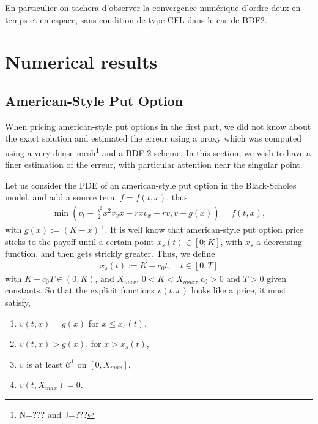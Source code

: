 \documentclass[12pt,a4paper]{article}
\begin{document}
En particulier on tachera d’observer la convergence numérique d’ordre deux en temps et en espace, sans condition de type CFL dans le cas de BDF2.

	\section{Numerical results}

		\subsection{American-Style Put Option}

When pricing american-style put options in the first part, we did not know about the exact solution and estimated the erreur using a proxy which was computed using a very dense mesh\footnote{N=??? and J=???} and a BDF-2 scheme. In this section, we wish to have a finer estimation of the erreur, with particular attention near the singular point.

Let us consider the PDE of an american-style put option in the Black-Scholes model, and add a source term $f = f(t,x)$, thus 
\begin{align}
	\min \left( v_t - \frac{\lambda^2}{2} x^2 v_xx - r x v_x + r v, v - g(x) \right) = f(t,x), \label{eq-PDE_ameroption_source}
\end{align} 
with $g(x) := (K-x)^+$. It is well know that american-style put option price sticks to the payoff until a certain point $x_s(t) \in [0; K]$, with $x_s$ a decreasing function, and then gets strickly greater. Thus, we define
\begin{align*}
	x_s(t) := K - c_0 t,  \quad t \in [0,T]
\end{align*}
with $K-c_0T \in (0, K)$, and $X_{max}$, $0<K<X_{max}$, $c_0>0$ and $T>0$ given constants. So that the explicit functions $v(t,x)$ looks like a price, it must satisfy,
\begin{small}
\begin{enumerate}
	\item $v(t,x) = g(x)$ for $x \leq x_s(t)$,
	\item $v(t,x) > g(x)$, for $x > x_s(t)$,
	\item $v$ is at least $\mathcal{C}^1$ on $[0, X_{max}]$,
	\item $v(t,X_{max}) = 0$.
\end{enumerate}
\end{small}
\end{document}
